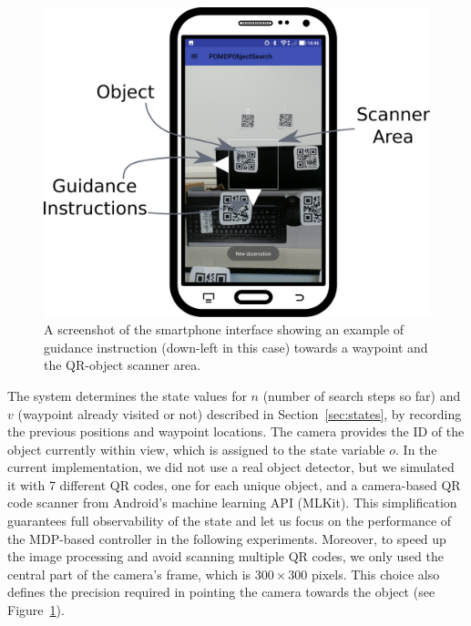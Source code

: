 \documentclass[a4paper, twoside]{article}
\begin{document}
\begin{figure}
  \centering
  \includegraphics[width=\columnwidth]{../figures/system_screenshot2.png}
  \caption{A screenshot of the smartphone interface showing an example of guidance instruction (down-left in this case) towards a waypoint and the QR-object scanner area.}\label{fig:system-screenshot}
\end{figure}

The system determines the state values for $n$ (number of search steps so far) and $v$ (waypoint already visited or not) described in Section~\ref{sec:states}, by recording the previous positions and waypoint locations. The camera provides the ID of the object currently within view, which is assigned to the state variable $o$. In the current implementation, we did not use a real object detector, but we simulated it with 7 different QR codes, one for each unique object, and a camera-based QR code scanner from Android's machine learning API (MLKit). This simplification guarantees full observability of the state and let us focus on the performance of the MDP-based controller in the following experiments. 
%
Moreover, to speed up the image processing and avoid scanning multiple QR codes, we only used the central part of the camera's frame, which is $300\times300$ pixels. This choice also defines the precision required in pointing the camera towards the object (see Figure~\ref{fig:system-screenshot}).
\end{document}
